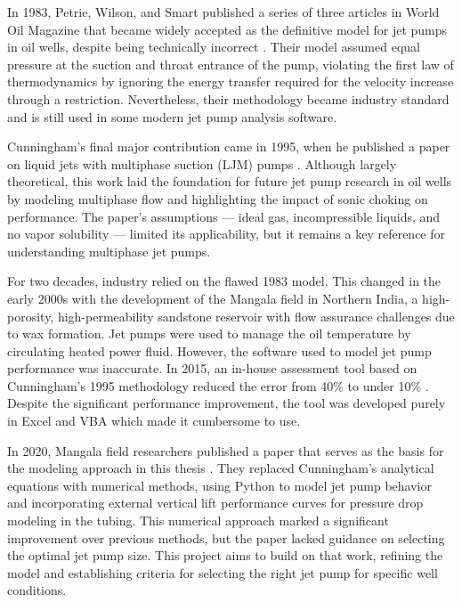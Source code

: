 \documentclass[../ellis_thesis.tex]{subfiles}
\begin{document}
In 1983, Petrie, Wilson, and Smart published a series of three articles in World Oil Magazine that became widely accepted as the definitive model for jet pumps in oil wells, despite being technically incorrect \cite{world_oil_one} \cite{world_oil_two} \cite{world_oil_three}. Their model assumed equal pressure at the suction and throat entrance of the pump, violating the first law of thermodynamics by ignoring the energy transfer required for the velocity increase through a restriction. Nevertheless, their methodology became industry standard and is still used in some modern jet pump analysis software.

Cunningham’s final major contribution came in 1995, when he published a paper on liquid jets with multiphase suction (LJM) pumps \cite{cunn_two}. Although largely theoretical, this work laid the foundation for future jet pump research in oil wells by modeling multiphase flow and highlighting the impact of sonic choking on performance. The paper’s assumptions — ideal gas, incompressible liquids, and no vapor solubility — limited its applicability, but it remains a key reference for understanding multiphase jet pumps.

For two decades, industry relied on the flawed 1983 model. This changed in the early 2000s with the development of the Mangala field in Northern India, a high-porosity, high-permeability sandstone reservoir with flow assurance challenges due to wax formation. Jet pumps were used to manage the oil temperature by circulating heated power fluid. However, the software used to model jet pump performance was inaccurate. In 2015, an in-house assessment tool based on Cunningham’s 1995 methodology reduced the error from 40\% to under 10\% \cite{mangala_critical}. Despite the significant performance improvement, the tool was developed purely in Excel and VBA which made it cumbersome to use.

In 2020, Mangala field researchers published a paper that serves as the basis for the modeling approach in this thesis \cite{mangala_numerical}. They replaced Cunningham’s analytical equations with numerical methods, using Python to model jet pump behavior and incorporating external vertical lift performance curves for pressure drop modeling in the tubing. This numerical approach marked a significant improvement over previous methods, but the paper lacked guidance on selecting the optimal jet pump size. This project aims to build on that work, refining the model and establishing criteria for selecting the right jet pump for specific well conditions.

\ifSubfilesClassLoaded{%
    \printbibliography}{}
\end{document}
